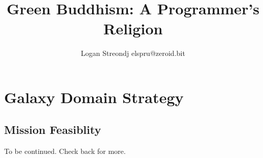 \documentclass{report}
\title{Green Buddhism: A Programmer's Religion}
\author{Logan Streondj elspru@zeroid.bit\\
  \doclicenceName}
\begin{document}
\part{Galaxy Domain Strategy}









\chapter{Mission Feasiblity}
\label{feasible}



To be continued.
Check back for more.
\end{document}
